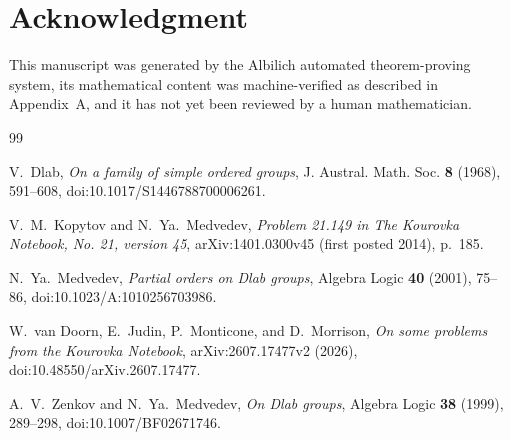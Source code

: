 \documentclass[11pt]{amsart}
\theoremstyle{definition}
\theoremstyle{remark}
\numberwithin{equation}{section}
\begin{document}
\section*{Acknowledgment}

This manuscript was generated by the Albilich automated theorem-proving system, its mathematical content was machine-verified as described in Appendix~A, and it has not yet been reviewed by a human mathematician.

\begin{thebibliography}{99}

V.~Dlab,
\emph{On a family of simple ordered groups},
J. Austral. Math. Soc. \textbf{8} (1968), 591--608,
doi:10.1017/S1446788700006261.

V.~M.~Kopytov and N.~Ya.~Medvedev,
\emph{Problem 21.149 in The Kourovka Notebook, No. 21, version 45},
arXiv:1401.0300v45 (first posted 2014), p.~185.

N.~Ya.~Medvedev,
\emph{Partial orders on Dlab groups},
Algebra Logic \textbf{40} (2001), 75--86,
doi:10.1023/A:1010256703986.

W.~van Doorn, E.~Judin, P.~Monticone, and D.~Morrison,
\emph{On some problems from the Kourovka Notebook},
arXiv:2607.17477v2 (2026),
doi:10.48550/arXiv.2607.17477.

A.~V.~Zenkov and N.~Ya.~Medvedev,
\emph{On Dlab groups},
Algebra Logic \textbf{38} (1999), 289--298,
doi:10.1007/BF02671746.

\end{thebibliography}
\end{document}
